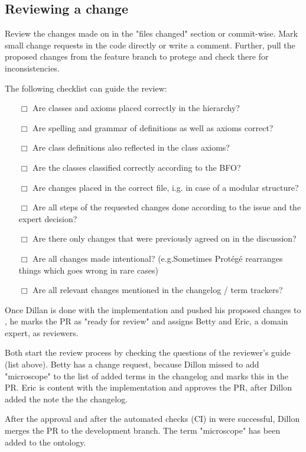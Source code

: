 \subsection{Reviewing a change}
Review the changes made on {\github} in the "files changed" section or commit-wise. Mark small change requests in the code directly or write a comment. Further, pull the proposed changes from the feature branch to protege and check there for inconsistencies. 

The following checklist can guide the review:
\begin{itemize}
    \item[$\Box$] Are classes and axioms placed correctly in the hierarchy?
    \item[$\Box$] Are spelling and grammar of definitions as well as axioms correct?
    \item[$\Box$] Are class definitions also reflected in the class axioms?
    \item[$\Box$] Are the classes classified correctly according to the BFO?
    \item[$\Box$] Are changes placed in the correct file, i.g. in case of a modular structure?
    \item[$\Box$] Are all steps of the requested changes done according to the issue and the expert decision?
    \item[$\Box$] Are there only changes that were previously agreed on in the discussion?
    \item[$\Box$] Are all changes made intentional? (e.g.Sometimes Protégé rearranges things which goes wrong in rare cases)
    \item[$\Box$] Are all relevant changes mentioned in the changelog / term trackers?
\end{itemize}
    
\begin{example}
Once Dillan is done with the implementation and pushed his proposed changes to {\github}, he marks the PR as "ready for review" and assigns Betty and Eric, a domain expert, as reviewers. 

Both start the review process by checking the questions of the reviewer's guide (list above). 
Betty has a change request, because Dillon missed to add "microscope" to the list of added terms in the changelog and marks this in the PR. Eric is content with the implementation and approves the PR, after Dillon added the note the the changelog.

After the approval and after the automated checks (CI) in {\github} were successful, Dillon merges the PR to the development branch. The term "microscope" has been added to the ontology.
\end{example}

